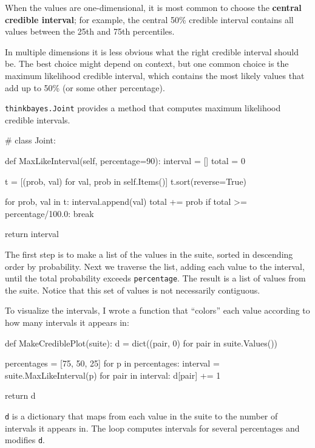\documentclass[12pt]{book}
\theoremstyle{exercise}
\begin{document}
When the values are one-dimensional, it is most common to choose
the {\bf central credible interval}; for example, the central 50\%
credible interval contains all values between the 25th and 75th
percentiles.

In multiple dimensions it is less obvious what the right credible
interval should be.  The best choice might depend on context, but
one common choice is the maximum likelihood credible interval, which
contains the most likely values that add up to 50\% (or some other
percentage).

{\tt thinkbayes.Joint} provides a method that computes maximum
likelihood credible intervals. 

\begin{code}
# class Joint:

    def MaxLikeInterval(self, percentage=90):
        interval = []
        total = 0

        t = [(prob, val) for val, prob in self.Items()]
        t.sort(reverse=True)

        for prob, val in t:
            interval.append(val)
            total += prob
            if total >= percentage/100.0:
                break

        return interval
\end{code}

The first step is to make a list of the values in the suite,
sorted in descending order by probability.  Next we traverse the
list, adding each value to the interval, until the total
probability exceeds {\tt percentage}.  The result is a list
of values from the suite.  Notice that this set of values
is not necessarily contiguous.

To visualize the intervals, I wrote a function that ``colors''
each value according to how many intervals it appears in:

\begin{code}
def MakeCrediblePlot(suite):
    d = dict((pair, 0) for pair in suite.Values())

    percentages = [75, 50, 25]
    for p in percentages:
        interval = suite.MaxLikeInterval(p)
        for pair in interval:
            d[pair] += 1

    return d
\end{code}

{\tt d} is a dictionary that maps from each value in the suite
to the number of intervals it appears in.  The loop computes intervals
for several percentages and modifies {\tt d}.
\end{document}
